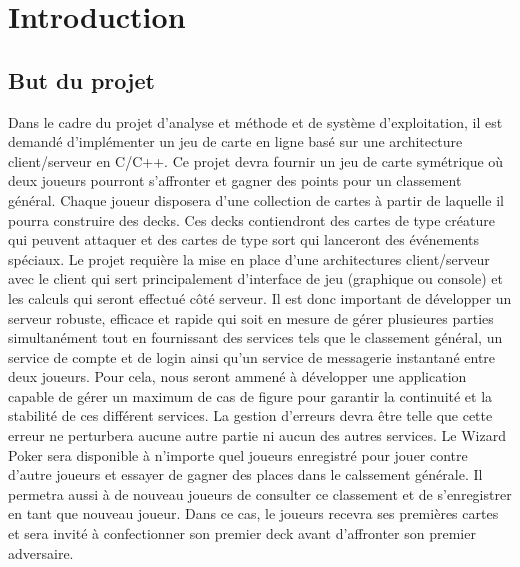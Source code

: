 \documentclass[11pt,a4paper]{article}
\begin{document}
    
    \pagestyle{empty}
\tableofcontents
\newpage
\pagestyle{fancy}

\setcounter{page}{1}

\section{Introduction}
\label{sec:intro}

\subsection{But du projet}
\label{sec:but}

Dans le cadre du projet d'analyse et méthode et de système d'exploitation, il est demandé d'implémenter un jeu de carte en ligne basé sur une architecture client/serveur en C/C++.
\medbreak
Ce projet devra fournir un jeu de carte symétrique où deux joueurs pourront s'affronter et gagner des points pour un classement général. Chaque joueur disposera d'une collection de cartes à partir de laquelle il pourra construire des decks. Ces decks contiendront des cartes de type créature qui peuvent attaquer et des cartes de type sort qui lanceront des événements spéciaux.
\medbreak
Le projet requière la mise en place d'une architectures client/serveur avec le client qui sert principalement d'interface de jeu (graphique ou console) et les calculs qui seront effectué côté serveur. Il est donc important de développer un serveur robuste, efficace et rapide qui soit en mesure de gérer plusieures parties simultanément tout en fournissant des services tels que le classement général, un service de compte et de login ainsi qu'un service de messagerie instantané entre deux joueurs. Pour cela, nous seront ammené à développer une application capable de gérer un maximum de cas de figure pour garantir la continuité et la stabilité de ces différent services. La gestion d'erreurs devra être telle que cette erreur ne perturbera aucune autre partie ni aucun des autres services.
\medbreak
Le Wizard Poker sera disponible à n'importe quel joueurs enregistré pour jouer contre d'autre joueurs et essayer de gagner des places dans le calssement générale. Il permetra aussi à de nouveau joueurs de consulter ce classement et de s'enregistrer en tant que nouveau joueur. Dans ce cas, le joueurs recevra ses premières cartes et sera invité à confectionner son premier deck avant d'affronter son premier adversaire.

\end{document}
